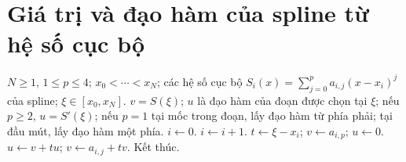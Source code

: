 \documentclass[12pt,a4paper,oneside]{book}
\numberwithin{algorithm}{chapter}
\theoremstyle{definition}
\begin{document}
\section{Giá trị và đạo hàm của spline từ hệ số cục bộ}
\begin{algorithm}[H]
\caption{Chọn đoạn và dùng Horner đồng thời}
\label{alg:spl-general-evaluate}
\begin{algorithmic}[1]
\Require $N\geq1$, $1\leq p\leq4$; $x_0<\cdots<x_N$; các hệ số cục bộ $S_i(x)=\sum_{j=0}^pa_{i,j}(x-x_i)^j$ của spline; $\xi\in[x_0,x_N]$.
\Ensure $v=S(\xi)$; $u$ là đạo hàm của đoạn được chọn tại $\xi$; nếu $p\geq2$, $u=S'(\xi)$; nếu $p=1$ tại mốc trong đoạn, lấy đạo hàm từ phía phải; tại đầu mút, lấy đạo hàm một phía.
\State $i\gets0$.
 \State $i\gets i+1$.
\EndWhile
\Statex
\State $t\gets\xi-x_i$; $v\gets a_{i,p}$; $u\gets0$.
 \State $u\gets v+tu$; $v\gets a_{i,j}+tv$.
\EndFor
\Statex
\State Kết thúc.
\end{algorithmic}
\end{algorithm}

\end{document}
